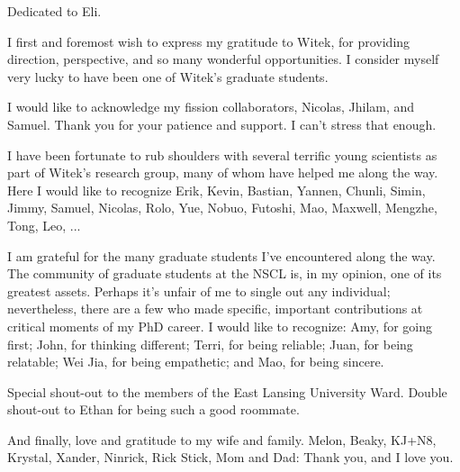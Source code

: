 \documentclass{msuphddissertation}
\begin{document}
\begin{dedication} 
\centering
Dedicated to Eli.
\end{dedication}

\begin{acknowledgment}
I first and foremost wish to express my gratitude to Witek, for providing direction, perspective, and so many wonderful opportunities. I consider myself very lucky to have been one of Witek's graduate students.

I would like to acknowledge my fission collaborators, Nicolas, Jhilam, and Samuel. Thank you for your patience and support. I can't stress that enough.

I have been fortunate to rub shoulders with several terrific young scientists as part of Witek's research group, many of whom have helped me along the way. Here I would like to recognize Erik, Kevin, Bastian, Yannen, Chunli, Simin, Jimmy, Samuel, Nicolas, Rolo, Yue, Nobuo, Futoshi, Mao, Maxwell, Mengzhe, Tong, Leo, ...

I am grateful for the many graduate students I've encountered along the way. The community of graduate students at the NSCL is, in my opinion, one of its greatest assets. Perhaps it's unfair of me to single out any individual; nevertheless, there are a few who made specific, important contributions at critical moments of my PhD career. I would like to recognize: 
Amy, for going first;
John, for thinking different;
Terri, for being reliable;
Juan, for being relatable;
Wei Jia, for being empathetic;
and Mao, for being sincere.

Special shout-out to the members of the East Lansing University Ward. Double shout-out to Ethan for being such a good roommate.

And finally, love and gratitude to my wife and family. Melon, Beaky, KJ+N8, Krystal, Xander, Ninrick, Rick Stick, Mom and Dad: Thank you, and I love you.
\end{acknowledgment}

\end{document}
